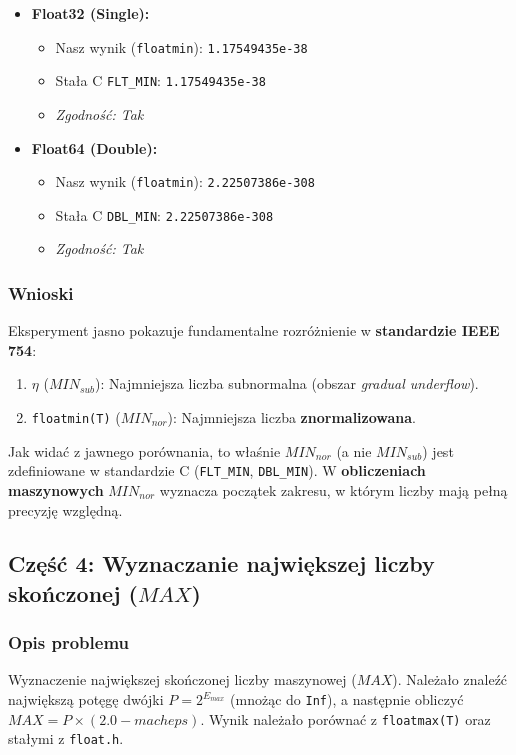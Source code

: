 \documentclass[12pt,a4paper]{article}
\begin{document}
\begin{minipage}{\textwidth} %
\begin{itemize}
    \item \textbf{Float32 (Single):}
    \begin{itemize}
        \item Nasz wynik (\texttt{floatmin}): \texttt{1.17549435e-38}
        \item Stała C \texttt{FLT\_MIN}: \texttt{1.17549435e-38}
        \item \textit{Zgodność: Tak}
    \end{itemize}
    \item \textbf{Float64 (Double):}
    \begin{itemize}
        \item Nasz wynik (\texttt{floatmin}): \texttt{2.22507386e-308}
        \item Stała C \texttt{DBL\_MIN}: \texttt{2.22507386e-308}
        \item \textit{Zgodność: Tak}
    \end{itemize}
\end{itemize}
\end{minipage} %

\subsubsection{Wnioski}
Eksperyment jasno pokazuje fundamentalne rozróżnienie w \textbf{standardzie IEEE 754}:
\begin{enumerate}
    \item $\eta$ ($MIN_{sub}$): Najmniejsza liczba subnormalna (obszar \textit{gradual underflow}).
    \item \texttt{floatmin(T)} ($MIN_{nor}$): Najmniejsza liczba \textbf{znormalizowana}.
\end{enumerate}
Jak widać z jawnego porównania, to właśnie $MIN_{nor}$ (a nie $MIN_{sub}$) jest zdefiniowane w standardzie C (\texttt{FLT\_MIN}, \texttt{DBL\_MIN}). W \textbf{obliczeniach maszynowych} $MIN_{nor}$ wyznacza początek zakresu, w którym liczby mają pełną precyzję względną.

\subsection{Część 4: Wyznaczanie największej liczby skończonej ($MAX$)}

\subsubsection{Opis problemu}
Wyznaczenie największej skończonej liczby maszynowej ($MAX$). Należało znaleźć największą potęgę dwójki $P = 2^{E_{max}}$ (mnożąc do \texttt{Inf}), a następnie obliczyć $MAX = P \times (2.0 - macheps)$. Wynik należało porównać z \texttt{floatmax(T)} oraz stałymi z \texttt{float.h}.
\end{document}
